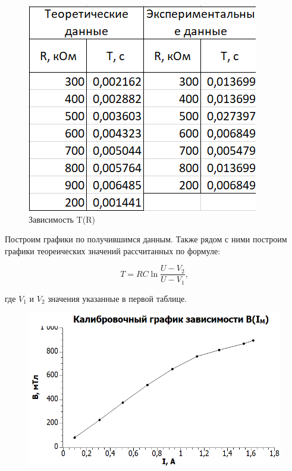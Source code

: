 \documentclass[11pt]{article}
\begin{document}
\begin{figure}[h!]
\centering
\includegraphics[scale=0.8]{table3.png}
\caption{Зависимость T(R)}
\label{fig:Image1}
\end{figure}

\vspace{0.5cm}

Построим графики по получившимся данным. Также рядом с ними построим графики теореических значений рассчитанных по формуле:

\begin{equation}
T = RC\ln \frac{U - V_2}{U - V_1},
\end{equation}

где $V_1$ и $V_2$ значения указанные в первой таблице.

\vspace{0.5cm}

\begin{figure}[h!]
\centering
\includegraphics[scale=1]{Graph2.png}
\label{fig:Image1}
\end{figure}
\end{document}
